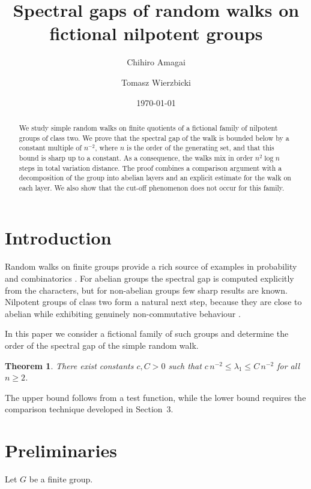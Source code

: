 \documentclass{amsart}
\newtheorem{theorem}{Theorem}[section]
\begin{document}
\title{Spectral gaps of random walks on fictional nilpotent groups}
\author{Chihiro Amagai}
\address{Department of Mathematics, Kitamachi University, Kitamachi 100-0000, Japan}
\author{Tomasz Wierzbicki}
\address{Institute of Imaginary Mathematics, University of Nowhere, 00-000 Nowhere, Freedonia}
\date{\today}
\begin{abstract}
We study simple random walks on finite quotients of a fictional family of nilpotent groups of class two.
We prove that the spectral gap of the walk is bounded below by a constant multiple of $n^{-2}$, where $n$ is the order of the generating set, and that this bound is sharp up to a constant.
As a consequence, the walks mix in order $n^{2}\log n$ steps in total variation distance.
The proof combines a comparison argument with a decomposition of the group into abelian layers and an explicit estimate for the walk on each layer.
We also show that the cut-off phenomenon does not occur for this family.
\end{abstract}
\maketitle
\section{Introduction}
Random walks on finite groups provide a rich source of examples in probability and combinatorics \cite{amagai2021,wierzbicki2022}.
For abelian groups the spectral gap is computed explicitly from the characters, but for non-abelian groups few sharp results are known.
Nilpotent groups of class two form a natural next step, because they are close to abelian while exhibiting genuinely non-commutative behaviour \cite{amagai2023}.

In this paper we consider a fictional family of such groups and determine the order of the spectral gap of the simple random walk.

\begin{theorem}
There exist constants $c, C > 0$ such that $c\, n^{-2} \le \lambda_1 \le C\, n^{-2}$ for all $n \ge 2$.
\end{theorem}

The upper bound follows from a test function, while the lower bound requires the comparison technique developed in Section~3.

\section{Preliminaries}
Let $G$ be a finite group.


\end{document}

